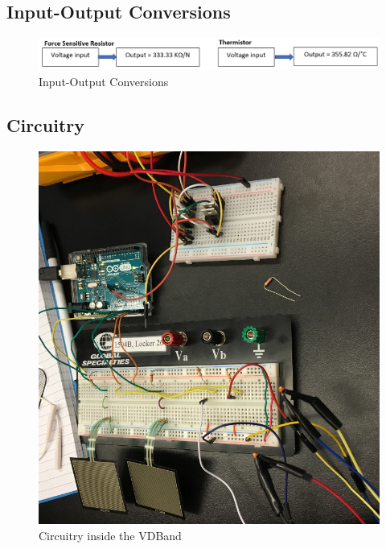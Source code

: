 \documentclass[11.5pt]{article}
\begin{document}
\subsection{Input-Output Conversions}
\begin{figure}[!ht]
    \centering
    \includegraphics[width=0.9\linewidth]{Appendix/IO.PNG}
    \caption{Input-Output Conversions}
    \label{fig:IO}
\end{figure}
\vspace{0.5mm}
\newpage

\subsection{Circuitry}
\begin{figure}[!ht]
    \centering
    \includegraphics[width=0.9\linewidth]{Appendix/circuitry.PNG}
    \caption{Circuitry inside the VDBand}
    \label{fig:C}
\end{figure}
\vspace{0.5mm}
\newpage
\end{document}
